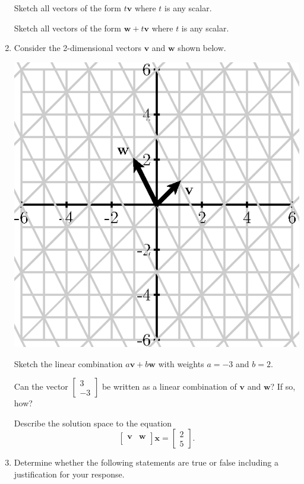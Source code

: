 \documentclass[12pt]{article}
\newcommand{\vs}[1]{\vspace{#1in}}
\newcommand{\vvec}{{\mathbf v}}
\newcommand{\wvec}{{\mathbf w}}
\newcommand{\xvec}{{\mathbf x}}
\newcommand{\twovec}[2]{\left[\begin{array}{r}#1 \\ #2
    \end{array}\right]}
\begin{document}
\begin{enumerate}
  Sketch all vectors of the form $t\vvec$ where $t$ is any scalar.

  \medskip

  Sketch all vectors of the form $\wvec + t\vvec$ where $t$ is any
  scalar.

  \medskip
  \newpage
\item Consider the 2-dimensional vectors $\vvec$ and $\wvec$ shown
  below.

  \begin{center}
    \includegraphics{12-review-fig.eps}
  \end{center}

  Sketch the linear combination $a\vvec + b\wvec$ with weights $a=-3$
  and $b=2$.

  \medskip
  Can the vector $\twovec{3}{-3}$ be written as a linear combination
  of $\vvec$ and $\wvec$?  If so, how?

  \vs{1}
  Describe the solution space to the equation
  $$
  \left[
    \begin{array}{cc}
      \vvec & \wvec \\
    \end{array}
  \right]
  \xvec = \twovec{2}{5}.
  $$

  \vs{1}
  \newpage
\item Determine whether the following statements are true or false 
  including a justification for your response.


\end{enumerate}
\end{document}
